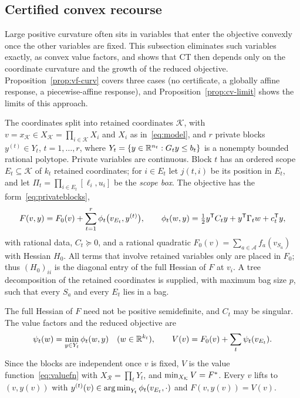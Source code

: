 \subsection{Certified convex recourse}\label{sec:convexrecourse}

Large positive curvature often sits in variables that enter the objective
convexly once the other variables are fixed. This subsection eliminates such
variables exactly, as convex value factors, and shows that CT then depends
only on the coordinate curvature and the growth of the reduced objective.
Proposition~\ref{prop:vf-curv} covers three cases (no certificate, a
globally affine response, a piecewise-affine response), and
Proposition~\ref{prop:cv-limit} shows the limits of this approach.

\begin{definition}\label{def:cv-model}
The coordinates split into retained coordinates $\mathcal K$, with
$v=x_{\mathcal K}\in X_{\mathcal K}=\prod_{i\in\mathcal K}X_i$ and $X_i$ as
in~\eqref{eq:model}, and $r$ private blocks $y^{(t)}\in Y_t$,
$t=1,\ldots,r$, where $Y_t=\{y\in\mathbb R^{n_t}:G_ty\le b_t\}$ is a nonempty
bounded rational polytope. Private variables are continuous. Block $t$ has
an ordered scope $E_t\subseteq\mathcal K$ of $k_t$ retained coordinates; for
$i\in E_t$ let $j(t,i)$ be its position in $E_t$, and let
$\Pi_t=\prod_{i\in E_t}[\ell_i,u_i]$ be the \emph{scope box}. The objective
has the form~\eqref{eq:privateblocks},
\begin{equation}\label{eq:cv-model}
F(v,y)=F_0(v)+\sum_{t=1}^r\phi_t\bigl(v_{E_t},y^{(t)}\bigr),\qquad
\phi_t(w,y)=\tfrac12y^{\mathsf T}C_ty+y^{\mathsf T}\Gamma_tw+c_t^{\mathsf T}y,
\end{equation}
with rational data, $C_t\succeq0$, and a rational quadratic
$F_0(v)=\sum_{a\in\mathcal A}f_a(v_{S_a})$ with Hessian $H_0$. All terms
that involve retained variables only are placed in $F_0$; thus $(H_0)_{ii}$
is the diagonal entry of the full Hessian of $F$ at $v_i$. A tree
decomposition of the retained coordinates is supplied, with maximum bag size
$p$, such that every $S_a$ and every $E_t$ lies in a bag.
\end{definition}

The full Hessian of $F$ need not be positive semidefinite, and $C_t$ may be
singular. The value factors and the reduced objective are
\begin{equation}\label{eq:cv-value}
\psi_t(w)=\min_{y\in Y_t}\phi_t(w,y)\quad(w\in\mathbb R^{k_t}),\qquad
V(v)=F_0(v)+\sum_t\psi_t(v_{E_t}).
\end{equation}
Since the blocks are independent once $v$ is fixed, $V$ is the value
function~\eqref{eq:valuefn} with $X_{\mathcal R}=\prod_tY_t$, and
$\min_{X_{\mathcal K}}V=F^{*}$. Every $v$ lifts to $(v,y(v))$ with
$y^{(t)}(v)\in\operatorname*{arg\,min}_{Y_t}\phi_t(v_{E_t},\cdot)$ and $F(v,y(v))=V(v)$.

